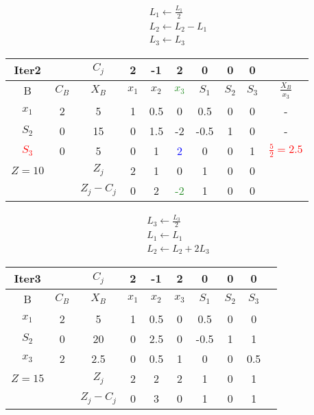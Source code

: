 \documentclass[]{article}
\begin{document}
\begin{align*}
    L_1 \leftarrow \frac{L_1}{2} \\
    L_2 \leftarrow L_2 - L_1 \\
    L_3 \leftarrow L_3
\end{align*}

\begin{center}
 \begin{tabular}{| c | c | c | c | c | c | c | c | c | c |} 
 \hline
 Iter2 &   & $C_j$ & 2 & -1 & 2 & 0 & 0 & 0 &  \\ [0.5ex] 
 \hline
 B & $C_B$ & $X_B$ & $x_1$ & $x_2$ & \textcolor{ForestGreen}{$x_3$} & $S_1$ & $S_2$ & $S_3$ & $\frac{X_B}{x_3}$ \\ 
 \hline
 $x_1$ & 2 & 5 & 1 & 0.5 & 0 & 0.5 & 0 & 0 & - \\
 \hline
 $S_2$ & 0 & 15 & 0 & 1.5 & -2 & -0.5 & 1 & 0 & - \\
 \hline
 \textcolor{red}{$S_3$} & 0 & 5 & 0 & 1 & \textcolor{blue}{2} & 0 & 0 & 1 & \textcolor{red}{$\frac{5}{2}=2.5$} \\
 \hline
 $Z=10$ &   & $Z_j$ & 2 & 1 & 0 & 1 & 0 & 0 &   \\
 \hline
  &   & $Z_j - C_j$ & 0 & 2 & \textcolor{ForestGreen}{-2} & 1 & 0 & 0 &   \\
 \hline
\end{tabular}
\end{center}

\begin{align*}
    L_3 \leftarrow \frac{L_3}{2} \\
    L_1 \leftarrow L_1 \\
    L_2 \leftarrow L_2 + 2L_3
\end{align*}

\begin{center}
 \begin{tabular}{| c | c | c | c | c | c | c | c | c | c |} 
 \hline
 Iter3 &   & $C_j$ & 2 & -1 & 2 & 0 & 0 & 0 &  \\ [0.5ex] 
 \hline
 B & $C_B$ & $X_B$ & $x_1$ & $x_2$ & $x_3$ & $S_1$ & $S_2$ & $S_3$ &  \\ 
 \hline
 $x_1$ & 2 & 5 & 1 & 0.5 & 0 & 0.5 & 0 & 0 &  \\
 \hline
 $S_2$ & 0 & 20 & 0 & 2.5 & 0 & -0.5 & 1 & 1 &  \\
 \hline
 $x_3$ & 2 & 2.5 & 0 & 0.5 & 1 & 0 & 0 & 0.5 &  \\
 \hline
 $Z=15$ &   & $Z_j$ & 2 & 2 & 2 & 1 & 0 & 1 &   \\
 \hline
  &   & $Z_j - C_j$ & 0 & 3 & 0 & 1 & 0 & 1 &   \\
 \hline
\end{tabular}
\end{center}
\end{document}
